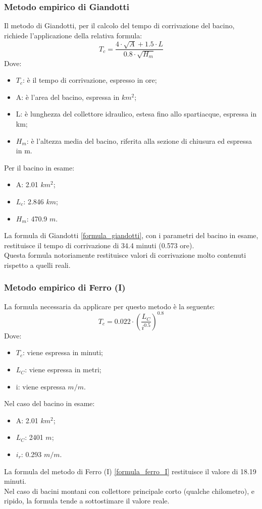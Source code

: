 \subsubsection{Metodo empirico di Giandotti}
Il metodo di Giandotti, per il calcolo del tempo di corrivazione del bacino, richiede l'applicazione della relativa formula:
\begin{equation}
    T_c = \frac{4 \cdot \sqrt{A}+ 1.5 \cdot L}{0.8 \cdot \sqrt{H_m}}
\label{formula_giandotti}
\end{equation}
Dove: 
\begin{itemize}
    \item $T_c$: è il tempo di corrivazione, espresso in ore;
    \item A: è l'area del bacino, espressa in $km^2$;
    \item L: è lunghezza del collettore idraulico, estesa fino allo spartiacque, espressa in km;
    \item $H_m$: è l'altezza media del bacino, riferita alla sezione di chiusura ed espressa in m.
\end{itemize}
Per il bacino in esame:
\begin{itemize}
    \item A: 2.01 $km^2$;
    \item $L_c$: 2.846 $km$;
    \item $H_m$: 470.9 $m$.
\end{itemize}
La formula di Giandotti \ref{formula_giandotti}, con i parametri del bacino in esame, restituisce il tempo di corrivazione di 34.4 minuti (0.573 ore).\\
Questa formula notoriamente restituisce valori di corrivazione molto contenuti rispetto a quelli reali.

\subsubsection{Metodo empirico di Ferro (I)}
La formula necessaria da applicare per questo metodo è la seguente:
\begin{equation}
    T_c = 0.022 \cdot \left(\frac{L_C}{i^{0.5}}\right)^{0.8}
    \label{formula_ferro_I}
\end{equation}
Dove: 
\begin{itemize}
    \item $T_c$: viene espressa in minuti;
    \item $L_C$: viene espressa in metri;
    \item i: viene espressa $m/m$.
\end{itemize}
Nel caso del bacino in esame:
\begin{itemize}
    \item A: 2.01 $km^2$;
    \item $L_C$: 2401 $m$;
    \item $i_r$: 0.293 $m/m$.
\end{itemize}
La formula del metodo di Ferro (I) \ref{formula_ferro_I} restituisce il valore di 18.19 minuti.\\
Nel caso di bacini montani con collettore principale corto (qualche chilometro), e ripido, la formula tende a sottostimare il valore reale.

